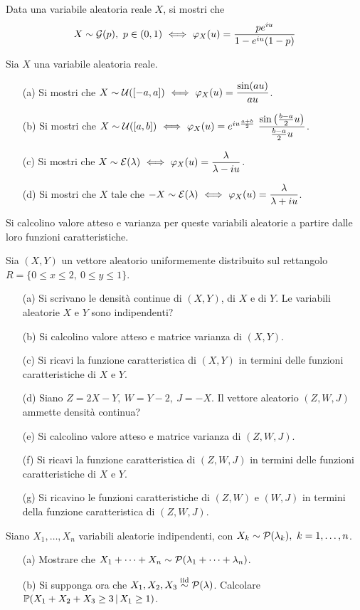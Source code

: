 \Esercizio{} %
Data una variabile aleatoria reale $X$, si mostri che
\[
X\sim \GGG(p),\ p\in(0,1)\SESOLOSE \varphi_X(u)=\frac{pe^{iu}}{1-e^{iu}(1-p)}
\]

\Esercizio{} %
Sia $X$ una variabile aleatoria reale.
\begin{enumerate}
\item [(a)] Si mostri che $X\sim \mathcal{U}([-a,a])\ \Longleftrightarrow\ \varphi_X(u)=\dfrac{\sin(au)}{au}$.
\item [(b)] Si mostri che $X\sim  \UUU([a,b])\SESOLOSE\varphi_X(u)=e^{iu\frac{a+b}{2}}\ \dfrac{\sin\left(\frac{b-a}{2}u\right)}{\frac{b-a}{2}u}$.
\item [(c)] Si mostri che $X\sim\mathcal{E}(\lambda)\ \Longleftrightarrow\ \varphi_X(u)=\dfrac{\lambda}{\lambda-iu}$.
\item [(d)] Si mostri che $X$ tale che $-X\sim\mathcal{E}(\lambda)\ \Longleftrightarrow\ \varphi_X(u)=\dfrac{\lambda}{\lambda+iu}$.
\end{enumerate}
Si calcolino valore atteso e varianza per queste variabili aleatorie a partire dalle loro funzioni caratteristiche.

\Esercizio{} %
Sia $(X,Y)$ un vettore aleatorio uniformemente distribuito sul rettangolo $R=\{0\leq x\leq 2,\ 0\leq y\leq 1\}$.
\begin{itemize}
\item [(a)] Si scrivano le densità continue di $(X,Y)$, di $X$ e di $Y$. Le variabili aleatorie $X$ e $Y$ sono indipendenti?
\item [(b)] Si calcolino valore atteso e matrice varianza di $(X,Y)$.
\item [(c)] Si ricavi la funzione caratteristica di $(X,Y)$ in termini delle funzioni caratteristiche di $X$ e $Y$.
\item [(d)] Siano $Z=2X-Y,\ W=Y-2,\ J=-X$. Il vettore aleatorio $(Z,W,J)$ ammette densità continua?
\item [(e)] Si calcolino valore atteso e matrice varianza di $(Z,W,J)$.
\item [(f)] Si ricavi la funzione caratteristica di $(Z,W,J)$ in termini delle funzioni caratteristiche di $X$ e $Y$.
\item [(g)] Si ricavino le funzioni caratteristiche di $(Z,W)$ e $(W,J)$ in termini della funzione caratteristica di $(Z,W,J)$.
\end{itemize}

\Esercizio{} %
Siano $X_1,\dots,X_n$ variabili aleatorie indipendenti, con $X_k\sim\mathcal{P}(\lambda_k),\ k=1,\dots,n$.
\begin{itemize}
\item [(a)] Mostrare che $X_1+\cdots+X_n\sim\mathcal{P}(\lambda_1+\cdots+\lambda_n)$.
\item [(b)] Si supponga ora che $X_1,X_2,X_3\stackrel{\mathrm{iid}}{\sim}\mathcal{P}(\lambda)$. Calcolare $\mathbb{P}(X_1+X_2+X_3\geq 3\,|\,X_1\geq 1)$. 
\end{itemize}

